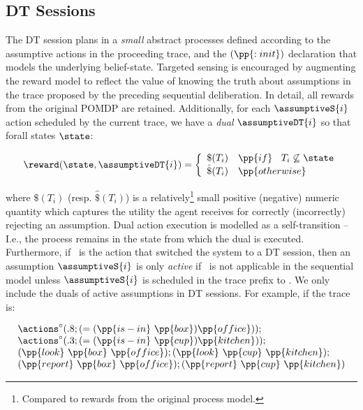 \subsection{DT Sessions}

The DT session plans in a {\em small} abstract processes defined
according to the assumptive actions in the proceeding trace, and the
$(\pp{:init})$ declaration that models the underlying
belief-state. Targeted sensing is encouraged by augmenting the reward
model to reflect the value of knowing the truth about assumptions in
the trace proposed by the preceding sequential deliberation. In
detail, all rewards from the original POMDP are
retained. Additionally, for each $\assumptiveS{i}$ action scheduled by
the current trace, we have a {\em dual} $\assumptiveDT{i}$ so that
forall states $\state$:

\small
\[
\reward(\state, \assumptiveDT{i}) = \bigg\{ \begin{array}{ll}
\$(T_i) & \pp{if}~\;\;T_i \not\subseteq \state \\
\hat\$(T_i) & \pp{otherwise} \\
\end{array}
\]
\normalsize

\noindent where $\$(T_i)$ (resp. $\hat\$(T_i)$) is a 
relatively\footnote{Compared to rewards from the original process
model.} small positive (negative) numeric quantity which captures the
utility the agent receives for correctly (incorrectly) rejecting an
assumption. Dual action execution is modelled as a self-transition --
I.e., the process remains in the state from which the dual is
executed.
Furthermore, if \switchAction\ is the action that switched the system
to a DT session, then an assumption $\assumptiveS{i}$ is only {\em
active} if
\switchAction\ is not applicable in the sequential model unless
$\assumptiveS{i}$ is scheduled in the trace prefix
to \switchAction. We only include the duals of active assumptions in
DT sessions. For example, if the trace is:

\small
\[
\begin{array}{l}
\actions^{\circ}(.8;(=(\pp{is-in}~\pp{box})\pp{office}));\\
\actions^{\circ}(.3;(=(\pp{is-in}~\pp{cup})\pp{kitchen}));\\
(\pp{look}~\pp{box}~\pp{office});
(\pp{look}~\pp{cup}~\pp{kitchen});\\
(\pp{report}~\pp{box}~\pp{office}); 
(\pp{report}~\pp{cup}~\pp{kitchen})
\end{array}
\]
\normalsize

